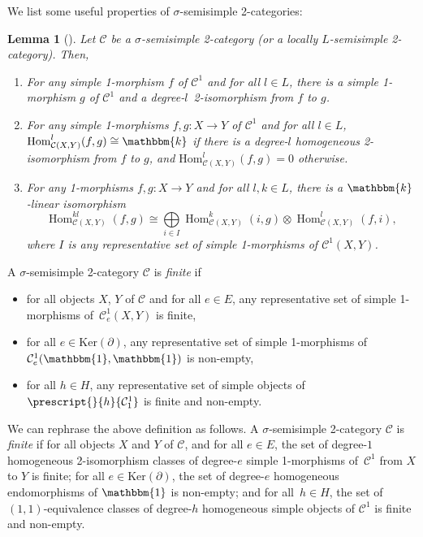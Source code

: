 \documentclass[a4paper, oneside]{amsart}
\numberwithin{equation}{subsection}
\theoremstyle{referencedlemma}
\newtheorem{lemref}[equation]{Lemma}
\theoremstyle{plain} %
\theoremstyle{remark}
\begin{document}
We list some useful properties of $\sigma$-semisimple 2-categories:
\begin{lemref}[\cite{sozer_monoidal_2023}]\label{Lemma SV}
Let $\mathcal{C}$ be a $\sigma$-semisimple 2-category (or a locally $L$-semisimple 2-category). Then,
\begin{enumerate}
\item For any simple 1-morphism $f$ of $\mathcal{C}^1$ and for all $l\in L$, there is a simple 1-morphism $g$ of $\mathcal{C}^1$ and a degree-$l$~2-isomorphism from $f$ to $g$.
\item For any simple 1-morphisms $f,g\colon X\to Y$ of $\mathcal{C}^1$ and for all $l\in L$,  $\mathrm{Hom}^l_{\mathcal{C}(X,Y)}(f,g) \cong \mathbbm{k}$ if there is a degree-$l$ homogeneous 2-isomorphism from $f$ to $g$,  and $\mathrm{Hom}^l_{\mathcal{C}(X,Y)}(f,g) = 0$ otherwise.
\item For any 1-morphisms $f,g \colon X \to Y$ and for all $l,k \in L$,  there is a $\mathbbm{k}$-linear isomorphism
$$
\operatorname{Hom}_{\mathcal{C}(X,Y)}^{kl}(f,g)\cong \bigoplus\limits_{i\in I}\operatorname{Hom}_{\mathcal{C}(X,Y)}^{k}(i, g)\otimes \operatorname{Hom}_{\mathcal{C}(X,Y)}^{l}(f,i),
$$
where $I$ is any representative set of simple 1-morphisms of $\mathcal{C}^1(X,Y)$.
\end{enumerate}

\end{lemref}

A $\sigma$-semisimple 2-category $\mathcal{C}$ is \emph{finite} if 
\begin{itemize}
\item for all objects $X$, $Y$ of $\mathcal{C}$ and for all $e\in E$,  any representative set of simple 1-morphisms of~$\mathcal{C}^1_e(X,Y)$ is finite,
\item for all $e\in \mathrm{Ker}(\partial)$, any representative set of simple 1-morphisms of~$\mathcal{C}_e^1(\mathbbm{1}, \mathbbm{1})$ is non-empty,
\item for all $h\in H$,  any representative set of simple objects of $\prescript{}{h}{\mathcal{C}_1^1}$ is finite and non-empty.
\end{itemize}
We can rephrase the above definition as follows. A $\sigma$-semisimple 2-category $\mathcal{C}$ is \emph{finite} if for all objects $X$ and $Y$ of $\mathcal{C}$, and for all $e\in E$,  the set of degree-$1$ homogeneous 2-isomorphism classes of degree-$e$ simple 1-morphisms of~$\mathcal{C}^1$ from $X$ to $Y$ is finite; for all $e\in \mathrm{Ker}(\partial)$, the set of degree-$e$ homogeneous endomorphisms of $\mathbbm{1}$ is non-empty; and for all~$h\in H$, the set of $(1,1)$-equivalence classes of degree-$h$ homogeneous simple objects of $\mathcal{C}^1$ is finite and non-empty.  
\end{document}
